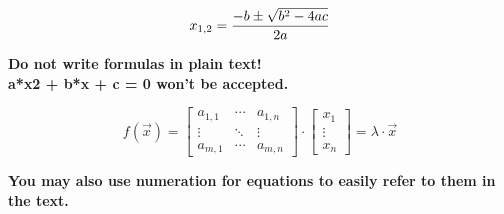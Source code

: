 \documentclass[a4paper]{article}
\begin{document}
\lipsum[1]

\begin{equation*}
x_{1,2} = {{-b  \pm \sqrt{b^2 - 4ac}} \over 2a}
\end{equation*}

\begin{center}
    {\color{red}\textbf{Do not write formulas in plain text! \\
    a*x2 + b*x + c = 0 won't be accepted.}}
\end{center}

\lipsum[2]

\begin{equation}
    f(\vec{x}) =
    \begin{bmatrix}
    a_{1,1} & \cdots & a_{1,n} \\
    \vdots  & \ddots & \vdots  \\
    a_{m,1} & \cdots & a_{m,n} 
\end{bmatrix}
\cdot
\begin{bmatrix}
    x_{1} \\
    \vdots  \\
    x_{n} 
\end{bmatrix}
= \lambda \cdot \vec{x}
\end{equation}

\begin{center}
    {\color{red}\textbf{You may also use numeration for equations to easily refer to them in the text.}}
\end{center}
\end{document}

